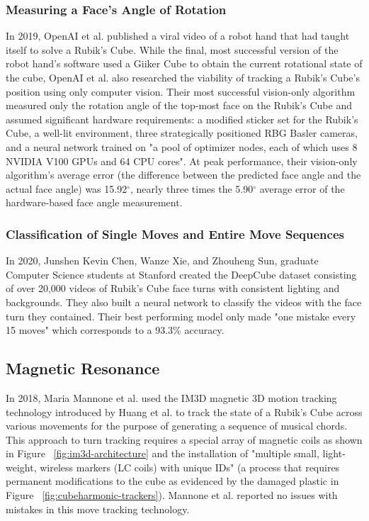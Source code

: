 \subsubsection{Measuring a Face's Angle of Rotation}
In 2019, OpenAI et al. published a viral video of a robot hand that had taught itself to solve a Rubik's Cube.
While the final, most successful version of the robot hand's software used a Giiker Cube to obtain the current rotational state of the cube, OpenAI et al. also researched the viability of tracking a Rubik's Cube's position using only computer vision.
Their most successful vision-only algorithm measured only the rotation angle of the top-most face on the Rubik's Cube and assumed significant hardware requirements: a modified sticker set for the Rubik's Cube, a well-lit environment, three strategically positioned RBG Basler cameras, and a neural network trained on "a pool of optimizer nodes, each of which uses 8 NVIDIA V100 GPUs and 64 CPU cores".
At peak performance, their vision-only algorithm's average error (the difference between the predicted face angle and the actual face angle) was 15.92$^\circ$, nearly three times the 5.90$^\circ$ average error of the hardware-based face angle measurement. \cite{openai2019rubiks}

\subsubsection{Classification of Single Moves and Entire Move Sequences}
In 2020, Junshen Kevin Chen, Wanze Xie, and Zhouheng Sun, graduate Computer Science students at Stanford created the DeepCube dataset consisting of over 20,000 videos of Rubik's Cube face turns with consistent lighting and backgrounds. 
They also built a neural network to classify the videos with the face turn they contained.
Their best performing model only made "one mistake every 15 moves" which corresponds to a 93.3\% accuracy. \cite{chendeepcube}


\subsection{Magnetic Resonance}
In 2018, Maria Mannone et al. used the IM3D magnetic 3D motion tracking technology introduced by Huang et al. \cite{im3d} to track the state of a Rubik's Cube across various movements for the purpose of generating a sequence of musical chords.
This approach to turn tracking requires a special array of magnetic coils as shown in Figure ~\ref{fig:im3d-architecture} and the installation of "multiple small, light-weight, wireless markers (LC coils) with unique IDs" (a process that requires permanent modifications to the cube as evidenced by the damaged plastic in Figure ~\ref{fig:cubeharmonic-trackers}).
Mannone et al. reported no issues with mistakes in this move tracking technology. \cite{mannone-cubeharmonic-2018}

